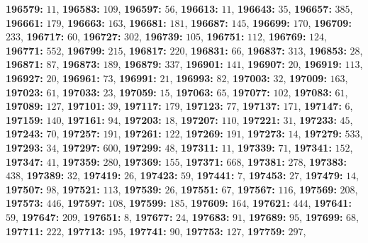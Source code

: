 \textsf{\bfseries 196579:} $11$, \textsf{\bfseries 196583:} $109$, \textsf{\bfseries 196597:} $56$, \textsf{\bfseries 196613:} $11$, \textsf{\bfseries 196643:} $35$, \textsf{\bfseries 196657:} $385$, \textsf{\bfseries 196661:} $179$, \textsf{\bfseries 196663:} $163$, \textsf{\bfseries 196681:} $181$, \textsf{\bfseries 196687:} $145$, \textsf{\bfseries 196699:} $170$, \textsf{\bfseries 196709:} $233$, \textsf{\bfseries 196717:} $60$, \textsf{\bfseries 196727:} $302$, \textsf{\bfseries 196739:} $105$, \textsf{\bfseries 196751:} $112$, \textsf{\bfseries 196769:} $124$, \textsf{\bfseries 196771:} $552$, \textsf{\bfseries 196799:} $215$, \textsf{\bfseries 196817:} $220$, \textsf{\bfseries 196831:} $66$, \textsf{\bfseries 196837:} $313$, \textsf{\bfseries 196853:} $28$, \textsf{\bfseries 196871:} $87$, \textsf{\bfseries 196873:} $189$, \textsf{\bfseries 196879:} $337$, \textsf{\bfseries 196901:} $141$, \textsf{\bfseries 196907:} $20$, \textsf{\bfseries 196919:} $113$, \textsf{\bfseries 196927:} $20$, \textsf{\bfseries 196961:} $73$, \textsf{\bfseries 196991:} $21$, \textsf{\bfseries 196993:} $82$, \textsf{\bfseries 197003:} $32$, \textsf{\bfseries 197009:} $163$, \textsf{\bfseries 197023:} $61$, \textsf{\bfseries 197033:} $23$, \textsf{\bfseries 197059:} $15$, \textsf{\bfseries 197063:} $65$, \textsf{\bfseries 197077:} $102$, \textsf{\bfseries 197083:} $61$, \textsf{\bfseries 197089:} $127$, \textsf{\bfseries 197101:} $39$, \textsf{\bfseries 197117:} $179$, \textsf{\bfseries 197123:} $77$, \textsf{\bfseries 197137:} $171$, \textsf{\bfseries 197147:} $6$, \textsf{\bfseries 197159:} $140$, \textsf{\bfseries 197161:} $94$, \textsf{\bfseries 197203:} $18$, \textsf{\bfseries 197207:} $110$, \textsf{\bfseries 197221:} $31$, \textsf{\bfseries 197233:} $45$, \textsf{\bfseries 197243:} $70$, \textsf{\bfseries 197257:} $191$, \textsf{\bfseries 197261:} $122$, \textsf{\bfseries 197269:} $191$, \textsf{\bfseries 197273:} $14$, \textsf{\bfseries 197279:} $533$, \textsf{\bfseries 197293:} $34$, \textsf{\bfseries 197297:} $600$, \textsf{\bfseries 197299:} $48$, \textsf{\bfseries 197311:} $11$, \textsf{\bfseries 197339:} $71$, \textsf{\bfseries 197341:} $152$, \textsf{\bfseries 197347:} $41$, \textsf{\bfseries 197359:} $280$, \textsf{\bfseries 197369:} $155$, \textsf{\bfseries 197371:} $668$, \textsf{\bfseries 197381:} $278$, \textsf{\bfseries 197383:} $438$, \textsf{\bfseries 197389:} $32$, \textsf{\bfseries 197419:} $26$, \textsf{\bfseries 197423:} $59$, \textsf{\bfseries 197441:} $7$, \textsf{\bfseries 197453:} $27$, \textsf{\bfseries 197479:} $14$, \textsf{\bfseries 197507:} $98$, \textsf{\bfseries 197521:} $113$, \textsf{\bfseries 197539:} $26$, \textsf{\bfseries 197551:} $67$, \textsf{\bfseries 197567:} $116$, \textsf{\bfseries 197569:} $208$, \textsf{\bfseries 197573:} $446$, \textsf{\bfseries 197597:} $108$, \textsf{\bfseries 197599:} $185$, \textsf{\bfseries 197609:} $164$, \textsf{\bfseries 197621:} $444$, \textsf{\bfseries 197641:} $59$, \textsf{\bfseries 197647:} $209$, \textsf{\bfseries 197651:} $8$, \textsf{\bfseries 197677:} $24$, \textsf{\bfseries 197683:} $91$, \textsf{\bfseries 197689:} $95$, \textsf{\bfseries 197699:} $68$, \textsf{\bfseries 197711:} $222$, \textsf{\bfseries 197713:} $195$, \textsf{\bfseries 197741:} $90$, \textsf{\bfseries 197753:} $127$, \textsf{\bfseries 197759:} $297$, 
